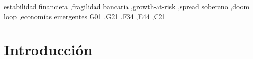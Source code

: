 \documentclass[5p,times,twocolumn,authoryear]{elsarticle}
\begin{document}
\begin{frontmatter}
\begin{abstract}
motiva la ampliación de la cobertura de datos como condición para extender la conclusión al resto de la muestra de economías emergentes.
\end{abstract}

\begin{keyword}
estabilidad financiera \sep fragilidad bancaria \sep growth-at-risk \sep spread soberano \sep doom loop \sep economías emergentes
\JEL G01 \sep G21 \sep F34 \sep E44 \sep C21
\end{keyword}

\end{frontmatter}

\section{Introducción}
\end{document}

